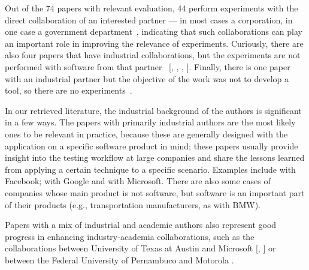 Out of the 74 papers with relevant evaluation, 44 perform experiments with the direct collaboration of an interested partner --- in most cases a corporation, in one case a government department~, indicating that such collaborations can play an important role in improving the relevance of experiments.
Curiously, there are also four papers that have industrial collaborations, but the experiments are not performed with software from that partner~
[, 
, 
, 
].
Finally, there is one paper with an industrial partner but the objective of the work was not to develop a tool, so there are no experiments~.

In our retrieved literature, the industrial background of the authors is significant in a few ways.
The papers with primarily industrial authors are the most likely ones to be relevant in practice, because these are generally designed with the application on a specific software product in mind; these papers usually provide insight into the testing workflow at large companies and share the lessons learned from applying a certain technique to a specific scenario.
Examples include  with Facebook;  with Google and  with Microsoft. There are also some cases of companies whose main product is not software, but software is an important part of their products (e.g., transportation manufacturers, as  with BMW).

Papers with a mix of industrial and academic authors also represent good progress in enhancing industry-academia collaborations, such as the collaborations between University of Texas at Austin and Microsoft [, ] or between the Federal University of Pernambuco and Motorola .

